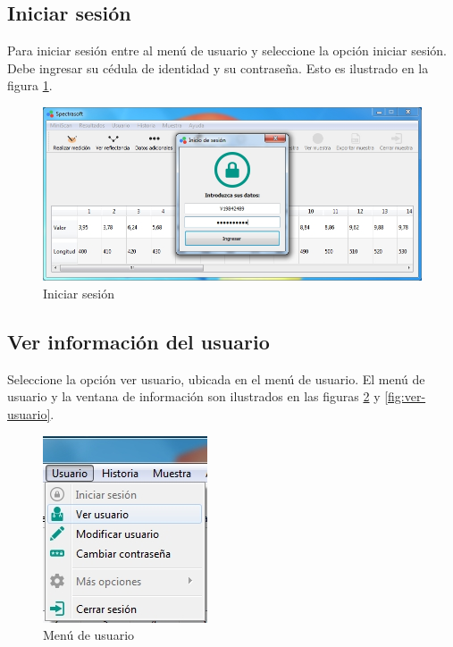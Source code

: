 	\subsection*{Iniciar sesi\'{o}n}
	
	Para iniciar sesi\'{o}n entre al men\'{u} de usuario y seleccione la opci\'{o}n iniciar sesi\'{o}n. Debe ingresar su c\'{e}dula de identidad y su contrase\~{n}a. Esto es ilustrado en la figura \ref{fig:iniciar-sesion}.
	
\begin{figure}[H]
  \centering
  \includegraphics[width=1\linewidth]{./img/inicio-sesion.jpg}
\caption[]{Iniciar sesi\'{o}n\label{fig:iniciar-sesion}}
\end{figure}
	
	\subsection*{Ver informaci\'{o}n del usuario}
	
	Seleccione la opci\'{o}n ver usuario, ubicada en el men\'{u} de usuario. El men\'{u} de usuario y la ventana de informaci\'{o}n son ilustrados en las figuras \ref{fig:menu-usuario} y \ref{fig:ver-usuario}.
\newpage
\null
\vfill
\begin{figure}[H]
  \centering
  \includegraphics[width=.3\linewidth]{./img/menu-usuario.jpg}
\caption[]{Men\'{u} de usuario\label{fig:menu-usuario}}
\end{figure}

